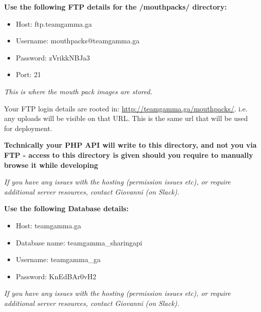 \documentclass{article}
\begin{document}
\textbf{Use the following FTP details for the /mouthpacks/ directory:} \\

\begin{itemize}
\begin{itemize}
\item Host: ftp.teamgamma.ga
\item Username: mouthpacks@teamgamma.ga
\item Password: zVrikkNBJa3
\item Port: 21
\end{itemize}
\end{itemize}

\begin{center}
   \textit{This is where the mouth pack images are stored.}
\end{center}

Your FTP login details are rooted in: \url{http://teamgamma.ga/mouthpacks/}. i.e. any uploads will be visible on that URL. This is the same url that will be used for deployment. 

\textbf{Technically your PHP API will write to this directory, and not you via FTP - access to this directory is given should you require to manually browse it while developing}

\begin{center}
   \textit{If you have any issues with the hosting (permission issues etc), or require additional server resources, contact Giovanni (on Slack).}
\end{center}

\newpage
\textbf{Use the following Database details:} 

\begin{itemize}
    \begin{itemize}
        \item Host: teamgamma.ga
        \item Database name: teamgamma\_sharingapi
        \item Username: teamgamma\_ga
        \item Password: KnEdBAr0vH2
    \end{itemize}
\end{itemize}

\begin{center}
   \textit{If you have any issues with the hosting (permission issues etc), or require additional server resources, contact Giovanni (on Slack).}
\end{center}
\end{document}
